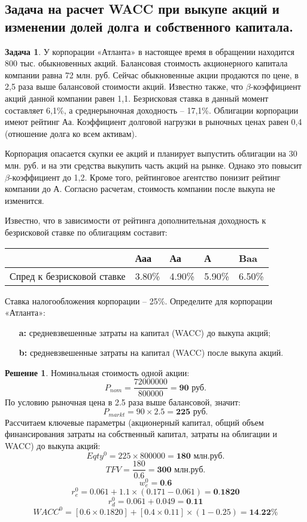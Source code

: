 \documentclass[a4paper, 14pt]{article}
\theoremstyle{plain} %
\theoremstyle{definition} %
\newtheorem*{solution}{Решение}
\newtheorem{problem}{Задача}[subsection]
\theoremstyle{remark} %
\begin{document}
\subsection{Задача  на  расчет WACC при  выкупе  акций  и  изменении  долей  долга  и собственного капитала.}
\begin{problem}
		У корпорации «Атланта» в настоящее время  в обращении находится 800 тыс. обыкновенных акций. Балансовая стоимость акционерного капитала компании равна 72 млн. руб. Сейчас обыкновенные акции продаются по цене, в 2,5 раза выше балансовой стоимости акций. Известно также, что $\beta$-коэффициент акций данной компании равен 1,1. Безрисковая ставка в данный момент составляет 6,1\%, а среднерыночная доходность – 17,1\%. Облигации корпорации имеют рейтинг Аа. Коэффициент долговой нагрузки в рыночных ценах равен 0,4 (отношение долга ко всем активам).

		Корпорация опасается скупки ее акций и планирует выпустить облигации на 30 млн. руб. и на эти средства выкупить часть акций на рынке. Однако это повысит $\beta$-коэффициент до 1,2. Кроме того, рейтинговое агентство понизит рейтинг компании до А. Согласно расчетам, стоимость компании после выкупа не изменится.

		Известно, что в зависимости от рейтинга дополнительная доходность к безрисковой ставке по облигациям составит:
\begin{center}
\begin{tabular}{|l|l|l|l|l|}
\hline
                           & Ааа    & Аа     & А      & Baa     \\
\hline
Спред к безрисковой ставке & 3.80\% & 4.90\% & 5.90\% & 6.50\%  \\
\hline
\end{tabular}
\end{center}
		Ставка налогообложения корпорации – 25\%. Определите для корпорации «Атланта»:
		\begin{itemize}
			\item[\textbf{a:}] средневзвешенные затраты на капитал (WACC) до выкупа акций;
			\item[\textbf{b:}] средневзвешенные затраты на капитал (WACC) после выкупа акций.
		\end{itemize}
	\begin{solution}
		Номинальная стоимость одной акции:
		\[P_{nom} = \frac{72000000}{800000} = \textbf{90 руб.}\]
		По условию рыночная цена в 2.5 раза выше балансовой, значит:
		\[P_{markt} = 90 \times 2.5 = \textbf{225 руб.}\]
		Рассчитаем ключевые параметры (акционерный капитал, общий объем финансирования затраты на собственный капитал, затраты на облигации и WACC) до выкупа акций:
		\[Eqty^{0} = 225 \times 800 000 = \textbf{180 млн.руб.}\]
		\[TFV = \frac{180}{0.6} = \textbf{300 млн.руб.}\]
		\[w_{e}^{0} = \textbf{0.6}\]
		\[r_{e}^{0} = 0.061 + 1.1 \times (0.171 - 0.061) = \textbf{0.1820}\]
		\[r_{d}^{0} = 0.061 + 0.049 = \textbf{0.11}\]
		\[WACC^{0} = \left[0.6 \times 0.1820\right] + \left[0.4 \times 0.11 \right] \times (1-0.25) = \textbf{14.22\%}\]


\end{solution}
\end{problem}
\end{document}
